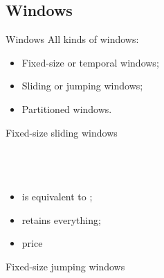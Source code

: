 \documentclass[brown, compress, mathserif]{beamer}
\begin{document}
\subsection{Windows}

\begin{frame}{Windows}
  All kinds of windows:
  \begin{itemize}
  \item Fixed-size or temporal windows;
  \item Sliding or jumping windows;
  \item Partitioned windows.
  \end{itemize}
\end{frame}


\begin{frame}{Fixed-size sliding windows}
  \hlstd{}\hspace*{\fill}\\
  \hlstd{}\hlstd{}\hlsym{(}\hlsym{) }\hlstd{}\\
  \\
  \hlsym{= }\hlstd{}\hlstd{}\hspace*{\fill}\\
  \mbox{}
  \begin{itemize}
  \item {}   is equivalent to ;
  \item {} retains everything;
  \item {}   price
  \end{itemize}
\end{frame}


\begin{frame}{Fixed-size jumping windows}
  \hlstd{}\hspace*{\fill}\\
  \hlstd{}\hspace*{\fill}\\
  \hlstd{}\hlstd{}\hlsym{(}\hlsym{) }\hlstd{}\\
  \\
  \hlsym{= }\hlstd{}\hlstd{}\hspace*{\fill}\\
\end{frame}
\end{document}
